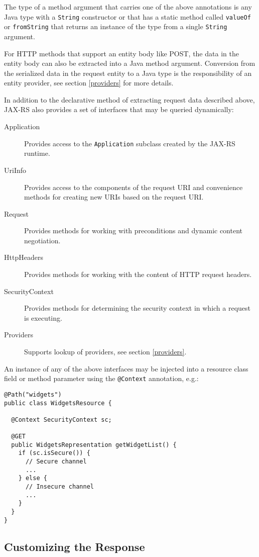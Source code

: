 \documentclass{acm_proc_article-sp}
\begin{document}
The type of a method argument that carries one of the above annotations is any Java type with a \texttt{String} constructor or that has a static method called \texttt{valueOf} or \texttt{fromString} that returns an instance of the type from a single \texttt{String} argument.

For HTTP methods that support an entity body like POST, the data in the entity body can also be extracted into a Java method argument. Conversion from the serialized data in the request entity to a Java type is the responsibility of an entity provider, see section \ref{providers} for more details.

In addition to the declarative method of extracting request data described above, JAX-RS also provides a set of interfaces that may be queried dynamically:

\begin{description}
\item[Application] Provides access to the \texttt{Application} subclass created by the JAX-RS runtime.
\item[UriInfo] Provides access to the components of the request URI and convenience methods for creating new URIs based on the request URI.
\item[Request] Provides methods for working with preconditions and dynamic content negotiation.
\item[HttpHeaders] Provides methods for working with the content of HTTP request headers.
\item[SecurityContext] Provides methods for determining the security context in which a request is executing.
\item[Providers] Supports lookup of providers, see section \ref{providers}.
\end{description}

An instance of any of the above interfaces may be injected into a resource class field or method parameter using the \texttt{@Context} annotation, e.g.:

\begin{verbatim}
@Path("widgets")
public class WidgetsResource {

  @Context SecurityContext sc;
  
  @GET
  public WidgetsRepresentation getWidgetList() {
    if (sc.isSecure()) {
      // Secure channel
      ...
    } else {
      // Insecure channel
      ...
    }
  }
}
\end{verbatim}

\subsection{Customizing the Response}
\end{document}

